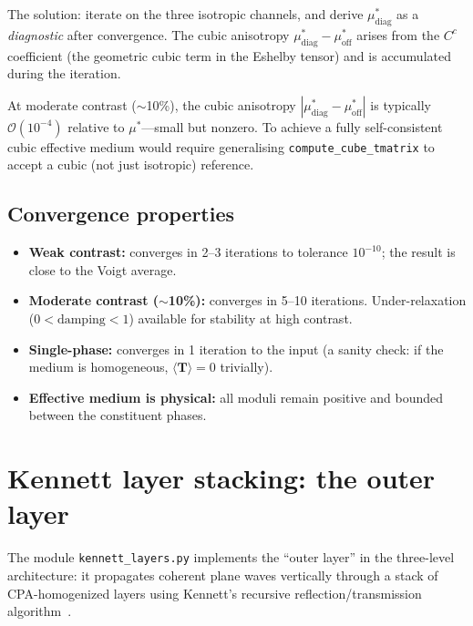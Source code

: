 \documentclass[11pt,a4paper]{article}
\newcommand{\order}{\mathcal{O}}
\newcommand{\bT}{\bm{T}}
\begin{document}
The solution: iterate on the three isotropic channels, and derive
$\mu^*_{\text{diag}}$ as a \emph{diagnostic} after convergence.
The cubic anisotropy $\mu^*_{\text{diag}} - \mu^*_{\text{off}}$
arises from the $C^c$ coefficient (the geometric cubic term in the
Eshelby tensor) and is accumulated during the iteration.

At moderate contrast ($\sim$10\%), the cubic anisotropy
$|\mu^*_{\text{diag}} - \mu^*_{\text{off}}|$ is typically
$\order(10^{-4})$ relative to $\mu^*$---small but nonzero.
To achieve a fully self-consistent cubic effective medium
would require generalising \texttt{compute\_cube\_tmatrix} to accept
a cubic (not just isotropic) reference.

\subsection{Convergence properties}

\begin{itemize}[nosep]
  \item \textbf{Weak contrast:} converges in 2--3 iterations to
    tolerance $10^{-10}$; the result is close to the Voigt average.
  \item \textbf{Moderate contrast ($\sim$10\%):} converges in 5--10
    iterations.  Under-relaxation ($0 < \text{damping} < 1$)
    available for stability at high contrast.
  \item \textbf{Single-phase:} converges in 1 iteration to the
    input (a sanity check: if the medium is homogeneous, $\langle\bT\rangle = 0$
    trivially).
  \item \textbf{Effective medium is physical:} all moduli remain
    positive and bounded between the constituent phases.
\end{itemize}

\section{Kennett layer stacking: the outer layer}
\label{sec:kennett}

The module \texttt{kennett\_layers.py} implements the ``outer layer''
in the three-level architecture: it propagates coherent plane waves
vertically through a stack of CPA-homogenized layers using Kennett's
recursive reflection/transmission algorithm~\cite{kennett1983}.
\end{document}
